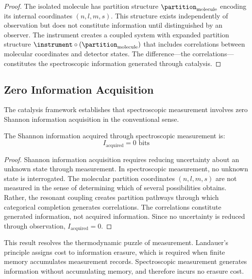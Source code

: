 \begin{proof}
The isolated molecule has partition structure $\partition_{\mathrm{molecule}}$ encoding its internal coordinates $(n, l, m, s)$. This structure exists independently of observation but does not constitute information until distinguished by an observer. The instrument creates a coupled system with expanded partition structure $\instrument \circ (\partition_{\mathrm{molecule}})$ that includes correlations between molecular coordinates and detector states. The difference—the correlations—constitutes the spectroscopic information generated through catalysis.
\end{proof}

\subsection{Zero Information Acquisition}

The catalysis framework establishes that spectroscopic measurement involves zero Shannon information acquisition in the conventional sense.

\begin{theorem}
\label{thm:zero_acquisition}
The Shannon information acquired through spectroscopic measurement is:
\begin{equation}
I_{\mathrm{acquired}} = 0 \text{ bits}
\end{equation}
\end{theorem}

\begin{proof}
Shannon information acquisition requires reducing uncertainty about an unknown state through measurement. In spectroscopic measurement, no unknown state is interrogated. The molecular partition coordinates $(n, l, m, s)$ are not measured in the sense of determining which of several possibilities obtains. Rather, the resonant coupling creates partition pathways through which categorical completion generates correlations. The correlations constitute generated information, not acquired information. Since no uncertainty is reduced through observation, $I_{\mathrm{acquired}} = 0$.
\end{proof}

This result resolves the thermodynamic puzzle of measurement. Landauer's principle assigns cost to information erasure, which is required when finite memory accumulates measurement records. Spectroscopic measurement generates information without accumulating memory, and therefore incurs no erasure cost.

